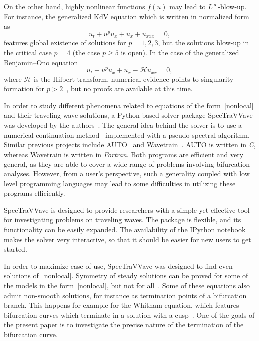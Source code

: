 On the other hand, highly nonlinear functions $f(u)$ may lead to $L^{\infty}$-blow-up.
For instance, the generalized KdV equation which is written in normalized form as
\begin{equation}
\label{kdv}
u_t + u^{p}u_x + u_x + u_{xxx} = 0,
\end{equation}
features global existence of solutions for $p=1,2,3$, 
but the solutions blow-up in the critical case $p=4$ (the case $p \ge 5$ is open).
In the case of the generalized Benjamin--Ono equation
\begin{equation*}
u_t + u^{p}u_x + u_x - \mathcal{H} u_{xx} = 0,
\end{equation*}
where $\mathcal{H}$ is the Hilbert transform, numerical evidence points to singularity formation 
for $p > 2$~\cite{Bona2004}, but no proofs are available at this time. 


In order to study different phenomena related to equations of the form~\eqref{nonlocal} 
and their traveling wave solutions, a \textsf{Python}-based solver package \textsf{SpecTraVVave} 
was developed by the authors~\cite{github}. 
The general idea behind the solver is to use a numerical continuation method~\cite{Keller1977} 
implemented with a pseudo-spectral algorithm. 
Similar previous projects include \textsf{AUTO}~\cite{Doedel1997} and \textsf{Wavetrain}~\cite{Sherratt2012}.
\textsf{AUTO} is written in \emph{C}, whereas \textsf{Wavetrain} is written in \emph{Fortran}. 
Both programs are efficient and very general, as they are able to cover a wide range of problems
involving bifurcation analyses. However, from a user's perspective, 
such a generality coupled with low level programming languages
may lead to some difficulties in utilizing these programs efficiently.

\textsf{SpecTraVVave} is designed to provide researchers with a simple yet effective tool 
for investigating problems on traveling waves. The package is flexible, 
and its functionality can be easily expanded. 
The availability of the \textsf{IPython} notebook \cite{Perez2007} makes the solver very interactive,
so that it should be easier for new users to get started.

In order to maximize ease of use, \textsf{SpecTraVVave} was designed
to find even solutions of~\eqref{nonlocal}.
Symmetry of steady solutions can be proved for some of the models
in the form~\eqref{nonlocal}, but not for all~\cite{Chen1998}.
Some of these equations also admit non-smooth solutions,
for instance as termination points of a bifurcation branch.
This happens for example for the Whitham equation, which features bifurcation
curves which terminate in a solution with a cusp~\cite{Wahlen2016}.
One of the goals of the present paper is to investigate the
precise nature of the termination of the bifurcation curve.




